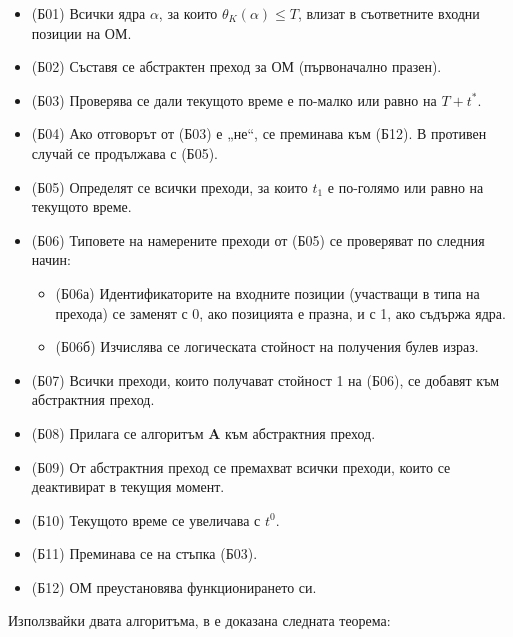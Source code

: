\begin{itemize}
  \item (Б01) Всички ядра $\alpha$, за които $\theta_{K}(\alpha) \leq T$, влизат в 
  съответните входни позиции на ОМ.
  
  \item (Б02) Съставя се абстрактен преход за ОМ (първоначално празен).
  
  \item (Б03) Проверява се дали текущото време е по-малко или равно на $T + t^{*}$.
  
  \item (Б04) Ако отговорът от (Б03) е „не“, се преминава към (Б12). В противен случай 
  се продължава с (Б05).
  
  \item (Б05) Определят се всички преходи, за които $t_1$ е по-голямо или равно на текущото време.
  
  \item (Б06) Типовете на намерените преходи от (Б05) се проверяват по следния начин:
  \begin{itemize}[itemsep=0.5em]
    \item (Б06а) Идентификаторите на входните позиции (участващи в типа на прехода) се заменят с 0, ако позицията е празна, и с 1, ако съдържа ядра.
    \item (Б06б) Изчислява се логическата стойност на получения булев израз.
  \end{itemize}

  \item (Б07) Всички преходи, които получават стойност 1 на (Б06), се добавят към абстрактния преход.
  
  \item (Б08) Прилага се алгоритъм {\bf A} към абстрактния преход.
  
  \item (Б09) От абстрактния преход се премахват всички преходи, които се деактивират в текущия момент.
  
  \item (Б10) Текущото време се увеличава с $t^{0}$.
  
  \item (Б11) Преминава се на стъпка (Б03).
  
  \item (Б12) ОМ преустановява функционирането си.
\end{itemize}

Използвайки двата алгоритъма, в \cite{Z1} е доказана следната теорема:


